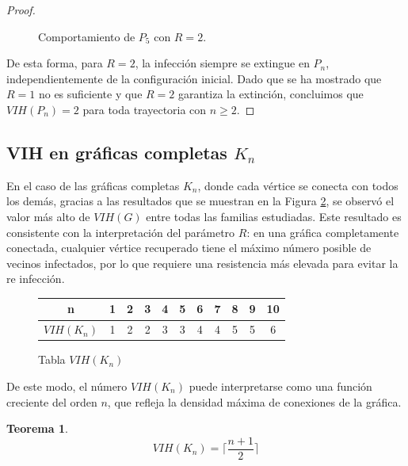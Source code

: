 \documentclass[12pt,titlepage,twoside,openright]{book}
\newtheorem{theorem}{Teorema}[section]
\begin{document}
\begin{proof}
\begin{figure}[h]
        \caption{Comportamiento de $P_5$ con $R=2$.}
        \label{PnyR=2}
    \end{figure}
    De esta forma, para $R=2$, la infecci\'on siempre se extingue en $P_n$, independientemente de la configuraci\'on inicial. Dado que se ha mostrado que $R=1$ no es suficiente y que $R=2$ garantiza la extinci\'on, concluimos que $VIH(P_n)=2$ para toda trayectoria con $n\ge 2$.
\end{proof}
\subsection{VIH en gr\'aficas completas $K_n$}
En el caso de las gr\'aficas completas $K_n$, donde cada v\'ertice se conecta con todos los dem\'as, gracias a las resultados que se muestran en la Figura \ref{tabla:VIH(K_n)}, se observ\'o el valor m\'as alto de $VIH(G)$ entre todas las familias estudiadas. Este resultado es consistente con la interpretaci\'on del par\'ametro $R$: en una gr\'afica completamente conectada, cualquier v\'ertice recuperado tiene el m\'aximo n\'umero posible de vecinos infectados, por lo que requiere una resistencia m\'as elevada para evitar la re infecci\'on.

\begin{figure}[h!]
    \centering
    \begin{tabular}{|c|cccccccccc|}
        \hline
        \textbf{n} & \textbf{1} & \textbf{2} & \textbf{3} & \textbf{4} & \textbf{5} & \textbf{6} & \textbf{7} & \textbf{8} & \textbf{9} & \textbf{10}\\
        \hline
        \textbf{$VIH(K_n)$} & 1 & 2 & 2 & 3 & 3 & 4 & 4 & 5 & 5 & 6 \\
        \hline
    \end{tabular}
    \caption{Tabla $VIH(K_n)$}
    \label{tabla:VIH(K_n)}
\end{figure}
De este modo, el n\'umero $VIH(K_n)$ puede interpretarse como una funci\'on creciente del orden $n$, que refleja la densidad m\'axima de conexiones de la gr\'afica.
\begin{theorem}\label{Teo:VIH(Kn)}
    $$
    VIH(K_n) = \lceil \frac{n+1}{2} \rceil
    $$
\end{theorem}
\end{document}
